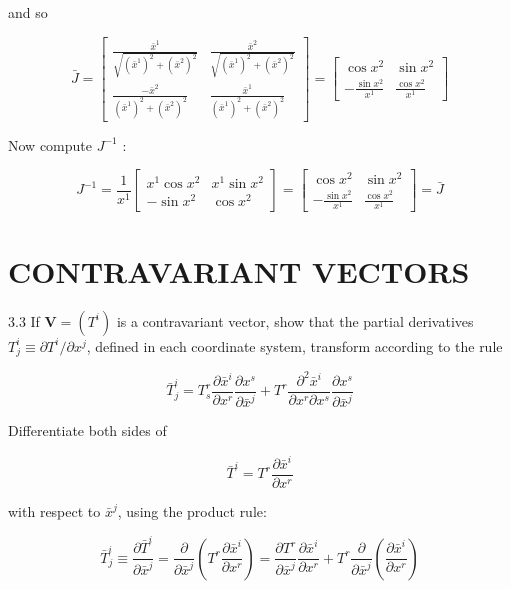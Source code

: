 \documentclass[10pt]{article}
\begin{document}
and so

$$
\bar{J}=\left[\begin{array}{cc}
\frac{\bar{x}^{1}}{\sqrt{\left(\bar{x}^{1}\right)^{2}+\left(\bar{x}^{2}\right)^{2}}} & \frac{\bar{x}^{2}}{\sqrt{\left(\bar{x}^{1}\right)^{2}+\left(\bar{x}^{2}\right)^{2}}} \\
\frac{-\bar{x}^{2}}{\left(\bar{x}^{1}\right)^{2}+\left(\bar{x}^{2}\right)^{2}} & \frac{\bar{x}^{1}}{\left(\bar{x}^{1}\right)^{2}+\left(\bar{x}^{2}\right)^{2}}
\end{array}\right]=\left[\begin{array}{cc}
\cos x^{2} & \sin x^{2} \\
-\frac{\sin x^{2}}{x^{1}} & \frac{\cos x^{2}}{x^{1}}
\end{array}\right]
$$

Now compute $J^{-1}$ :

$$
J^{-1}=\frac{1}{x^{1}}\left[\begin{array}{cc}
x^{1} \cos x^{2} & x^{1} \sin x^{2} \\
-\sin x^{2} & \cos x^{2}
\end{array}\right]=\left[\begin{array}{cc}
\cos x^{2} & \sin x^{2} \\
-\frac{\sin x^{2}}{x^{1}} & \frac{\cos x^{2}}{x^{1}}
\end{array}\right]=\bar{J}
$$

\section*{CONTRAVARIANT VECTORS}
3.3 If $\mathbf{V}=\left(T^{i}\right)$ is a contravariant vector, show that the partial derivatives $T_{j}^{i} \equiv \partial T^{i} / \partial x^{j}$, defined in each coordinate system, transform according to the rule

$$
\bar{T}_{j}^{i}=T_{s}^{r} \frac{\partial \bar{x}^{i}}{\partial x^{r}} \frac{\partial x^{s}}{\partial \bar{x}^{j}}+T^{r} \frac{\partial^{2} \bar{x}^{i}}{\partial x^{r} \partial x^{s}} \frac{\partial x^{s}}{\partial \bar{x}^{j}}
$$

Differentiate both sides of

$$
\bar{T}^{i}=T^{r} \frac{\partial \bar{x}^{i}}{\partial x^{r}}
$$

with respect to $\bar{x}^{j}$, using the product rule:


\begin{equation*}
\bar{T}_{j}^{i} \equiv \frac{\partial \bar{T}^{i}}{\partial \bar{x}^{j}}=\frac{\partial}{\partial \bar{x}^{j}}\left(T^{r} \frac{\partial \bar{x}^{i}}{\partial x^{r}}\right)=\frac{\partial T^{r}}{\partial \bar{x}^{j}} \frac{\partial \bar{x}^{i}}{\partial x^{r}}+T^{r} \frac{\partial}{\partial \bar{x}^{j}}\left(\frac{\partial \bar{x}^{i}}{\partial x^{r}}\right) \tag{1}
\end{equation*}
\end{document}
